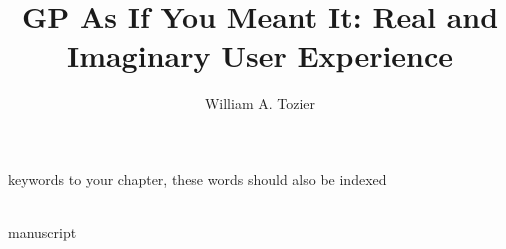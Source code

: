 %

\title*{GP As If You Meant It: Real and Imaginary User Experience}

\author{William A. Tozier}


\maketitle


\begin{keywords}
keywords to your chapter, these words should also be indexed
\end{keywords}
\\


{manuscript}





